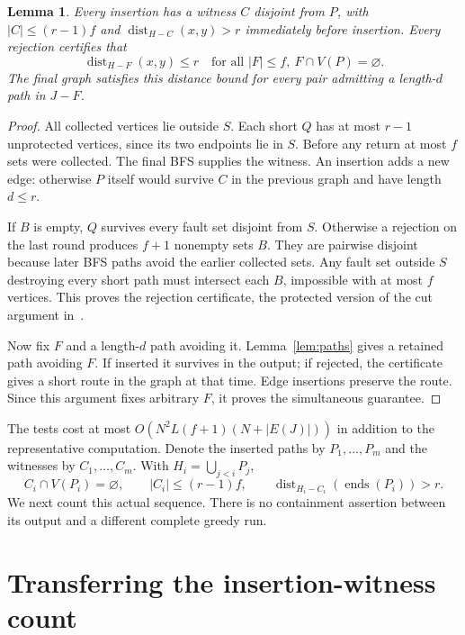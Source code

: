 \documentclass[acmsmall,11pt,screen,nonacm]{acmart}
\newcommand{\dist}{\operatorname{dist}}
\newtheorem{lemma}[theorem]{Lemma}
\begin{document}
\begin{lemma}\label{lem:scan}
Every insertion has a witness $C$ disjoint from $P$, with
$|C|\le(r-1)f$ and $\dist_{H-C}(x,y)>r$ immediately before insertion.
Every rejection certifies that
\[
 \dist_{H-F}(x,y)\le r
 \quad\text{for all } |F|\le f,\ F\cap V(P)=\varnothing.
\]
The final graph satisfies this distance bound for every pair admitting a
length-$d$ path in $J-F$.
\end{lemma}
\begin{proof}
All collected vertices lie outside $S$. Each short $Q$ has at most $r-1$
unprotected vertices, since its two endpoints lie in $S$. Before any return
at most $f$ sets were collected. The final BFS supplies the witness.
An insertion adds a new edge: otherwise $P$ itself would survive $C$ in
the previous graph and have length $d\le r$.

If $B$ is empty, $Q$ survives every fault set disjoint from $S$. Otherwise
a rejection on the last round produces $f+1$ nonempty sets $B$. They are
pairwise disjoint because later BFS paths avoid the earlier collected
sets. Any fault set outside $S$ destroying every short path must intersect
each $B$, impossible with at most $f$ vertices. This proves the rejection
certificate, the protected version of the cut argument in~\cite{DR20}.

Now fix $F$ and a length-$d$ path avoiding it. Lemma~\ref{lem:paths}
gives a retained path avoiding $F$. If inserted it survives in the output;
if rejected, the certificate gives a short route in the graph at that
time. Edge insertions preserve the route. Since this argument fixes
arbitrary $F$, it proves the simultaneous guarantee.
\end{proof}

The tests cost at most $O(N^2L(f+1)(N+|E(J)|))$ in addition to the
representative computation. Denote the inserted paths by $P_1,\ldots,P_m$
and the witnesses by $C_1,\ldots,C_m$. With $H_i=\bigcup_{j<i}P_j$,
\begin{equation}\label{eq:witness}
 C_i\cap V(P_i)=\varnothing,\qquad |C_i|\le(r-1)f,\qquad
 \dist_{H_i-C_i}(\operatorname{ends}(P_i))>r.
\end{equation}
We next count this actual sequence. There is no containment assertion
between its output and a different complete greedy run.

\section{Transferring the insertion-witness count}\label{sec:packing}
\end{document}
